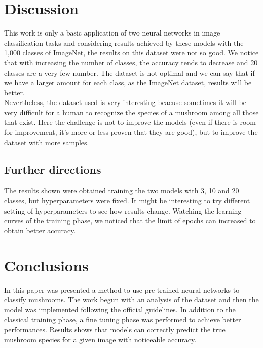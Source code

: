 \documentclass[12pt]{llncs}
\begin{document}
\section{Discussion}
This work is only a basic application of two neural networks in image classification tasks and considering results achieved by these models with the 1,000 classes of ImageNet, the results on this dataset were not so good. We notice that with increasing the number of classes, the accuracy tends to decrease and 20 classes are a very few number. The dataset is not optimal and we can say that if we have a larger amount for each class, as the ImageNet dataset, results will be better.\\
Nevertheless, the dataset used is very interesting beacuse sometimes it will be very difficult for a human to recognize the species of a mushroom among all those that exist. Here the challenge is not to improve the models (even if there is room for improvement, it's more or less proven that they are good), but to improve the dataset with more samples.

\subsection*{Further directions}
The results shown were obtained training the two models with 3, 10 and 20 classes, but hyperparameters were fixed. It might be interesting to try different setting of hyperparameters to see how results change. Watching the learning curves of the training phase, we noticed that the limit of epochs can increased to obtain better accuracy.

\section{Conclusions}
In this paper was presented a method to use pre-trained neural networks to classify mushrooms. The work begun with an analysis of the dataset and then the model was implemented following the official guidelines. In addition to the classical training phase, a fine tuning phase was performed to achieve better performances. Results shows that models can correctly predict the true mushroom species for a given image with noticeable accuracy.

\printbibliography[title={References}]
\end{document}
